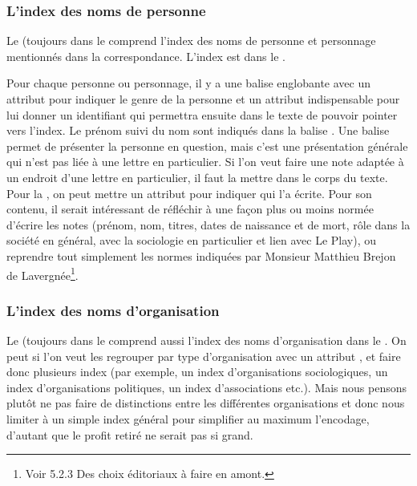\subsubsection{L'index des noms de personne}

Le  (toujours dans le  comprend l'index des noms de personne et personnage mentionnés dans la correspondance. L'index est dans le . 

Pour chaque personne ou personnage, il y a une balise englobante  avec un attribut  pour indiquer le genre de la personne et un attribut  indispensable pour lui donner un identifiant qui permettra ensuite dans le texte de pouvoir pointer vers l'index. Le prénom suivi du nom sont indiqués dans la balise . Une balise  permet de présenter la personne en question, mais c'est une présentation générale qui n'est pas liée à une lettre en particulier. Si l'on veut faire une note adaptée à un endroit d'une lettre en particulier, il faut la mettre dans le corps du texte. Pour la , on peut mettre un attribut  pour indiquer qui l'a écrite. Pour son contenu, il serait intéressant de réfléchir à une façon plus ou moins normée d'écrire les notes (prénom, nom, titres, dates de naissance et de mort, rôle dans la société en général, avec la sociologie en particulier et lien avec Le Play), ou reprendre tout simplement les normes indiquées par Monsieur Matthieu Brejon de Lavergnée\footnote{Voir 5.2.3 Des choix éditoriaux à faire en amont.}.

\subsubsection{L'index des noms d'organisation}

Le  (toujours dans le  comprend aussi l'index des noms d'organisation dans le . On peut si l'on veut les regrouper par type d'organisation avec un attribut , et faire donc plusieurs index (par exemple, un index d'organisations sociologiques, un index d'organisations politiques, un index d'associations etc.). Mais nous pensons plutôt ne pas faire de distinctions entre les différentes organisations et donc nous limiter à un simple index général pour simplifier au maximum l'encodage, d'autant que le profit retiré ne serait pas si grand.

